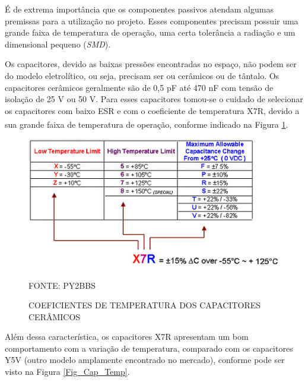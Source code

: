 \documentclass[
	12pt,				%
	openright,			%
	oneside,			%
	a4paper,			%
	english,			%
	french,				%
	spanish,			%
	brazil,				%
	oldfontcommands
	]{abntex2}
\begin{document}
	É de extrema importância que os componentes passivos atendam algumas premissas para a utilização no projeto. Esses componentes precisam possuir uma grande faixa de temperatura de operação, uma certa tolerância a radiação e um dimensional pequeno (\textit{SMD}).
	
	Os capacitores, devido as baixas pressões encontradas no espaço, não podem ser do modelo eletrolítico, ou seja, precisam ser ou cerâmicos ou de tântalo. Os capacitores cerâmicos geralmente são de 0,5 pF até 470 nF com tensão de isolação de 25 V ou 50 V. Para esses capacitores tomou-se o cuidado de selecionar os capacitores com baixo ESR e com o coeficiente de temperatura X7R, devido a sua grande faixa de temperatura de operação, conforme indicado na Figura \ref{Fig_Cap}.\textsuperscript{\cite{x7r}}
	
	\begin{figure}[th]
		\caption{COEFICIENTES DE TEMPERATURA DOS CAPACITORES CERÂMICOS}
		\label{Fig_Cap}
		\centering
		\includegraphics[width=1.0\linewidth]{./figs/x7r}
			
		\begin{small}
			FONTE: PY2BBS\textsuperscript{\cite{x7r}}
		\end{small}		
	\end{figure}	
	
	Além dessa característica, os capacitores X7R apresentam um bom comportamento com a variação de temperatura, comparado com os capacitores Y5V (outro modelo amplamente encontrado no mercado), conforme pode ser visto na Figura \ref{Fig_Cap_Temp}.
	
\end{document}

